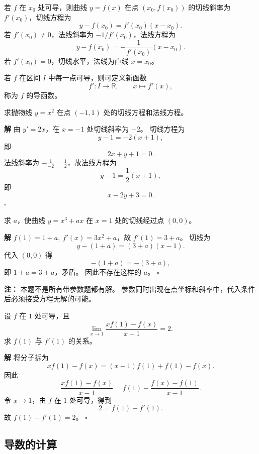 \documentclass[fontset=fandol]{ctexart}
\newenvironment{solution}{\par\noindent\textbf{解}\quad}{\hfill$\square$\par\vspace{0.8em}}
\newenvironment{warning}{\par\noindent\textbf{注：}\quad}{\par\vspace{0.8em}}
\newcommand{\RR}{\mathbb{R}}
\begin{document}
\begin{definition}[切线与法线]
若 $f$ 在 $x_0$ 处可导，则曲线 $y=f(x)$ 在点 $(x_0,f(x_0))$ 的切线斜率为 $f'(x_0)$，切线方程为
\[
y-f(x_0)=f'(x_0)(x-x_0).
\]
若 $f'(x_0)\neq0$，法线斜率为 $-1/f'(x_0)$，法线方程为
\[
y-f(x_0)=-\frac{1}{f'(x_0)}(x-x_0).
\]
若 $f'(x_0)=0$，切线水平，法线为直线 $x=x_0$。
\end{definition}

\begin{definition}[导函数]
若 $f$ 在区间 $I$ 中每一点可导，则可定义新函数
\[
f':I\to\RR,\qquad x\mapsto f'(x),
\]
称为 $f$ 的导函数。
\end{definition}

\begin{example}[切线与法线]
求抛物线 $y=x^2$ 在点 $(-1,1)$ 处的切线方程和法线方程。
\end{example}
\begin{solution}
由 $y'=2x$，在 $x=-1$ 处切线斜率为 $-2$。 切线方程为
\[
y-1=-2(x+1),
\]
即
\[
2x+y+1=0.
\]
法线斜率为 $-\frac1{-2}=\frac12$，故法线方程为
\[
y-1=\frac12(x+1),
\]
即
\[
x-2y+3=0.
\]
\end{solution}

\begin{example}[切线与参数]
求 $a$，使曲线 $y=x^3+ax$ 在 $x=1$ 处的切线经过点 $(0,0)$。
\end{example}
\begin{solution}
$f(1)=1+a,\ f'(x)=3x^2+a$，故 $f'(1)=3+a$。 切线为
\[
y-(1+a)=(3+a)(x-1).
\]
代入 $(0,0)$ 得
\[
-(1+a)=-(3+a),
\]
即 $1+a=3+a$，矛盾。 因此不存在这样的 $a$。
\end{solution}
\begin{warning}
本题不是所有带参数题都有解。 参数同时出现在点坐标和斜率中，代入条件后必须接受方程无解的可能。
\end{warning}

\begin{example}[由切线条件反求函数值]
设 $f$ 在 $1$ 处可导，且
\[
\lim_{x\to1}\frac{xf(1)-f(x)}{x-1}=2.
\]
求 $f(1)$ 与 $f'(1)$ 的关系。
\end{example}
\begin{solution}
将分子拆为
\[
xf(1)-f(x)=(x-1)f(1)+f(1)-f(x).
\]
因此
\[
\frac{xf(1)-f(x)}{x-1}
=f(1)-\frac{f(x)-f(1)}{x-1}.
\]
令 $x\to1$，由 $f$ 在 $1$ 处可导，得到
\[
2=f(1)-f'(1).
\]
故 $f(1)-f'(1)=2$。
\end{solution}

\subsection{导数的计算}
\end{document}
